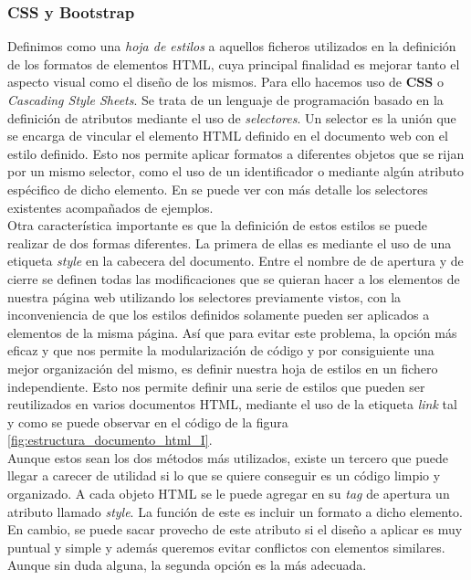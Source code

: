 \documentclass[../main.tex]{subfiles}
\begin{document}
    \subsubsection{CSS y Bootstrap}
    Definimos como una \textit{hoja de estilos} a aquellos ficheros utilizados en la definición de los formatos de elementos HTML, cuya principal finalidad es mejorar tanto el aspecto visual como el diseño de los mismos. Para ello hacemos uso de \textbf{CSS} o \textit{Cascading Style Sheets}. Se trata de un lenguaje de programación basado en la definición de atributos mediante el uso de \textit{selectores}. Un selector es la unión que se encarga de vincular el elemento HTML definido en el documento web con el estilo definido. Esto nos permite aplicar formatos a diferentes objetos que se rijan por un mismo selector, como el uso de un identificador o mediante algún atributo espécifico de dicho elemento.  En \cite{selectoresCSS} se puede ver con más detalle los selectores existentes acompañados de ejemplos. \\

 
    Otra característica importante es que la definición de estos estilos se puede realizar de dos formas diferentes. La primera de ellas es mediante el uso de una etiqueta \textit{style} en la cabecera del documento. Entre el nombre de  de apertura y de cierre se definen todas las modificaciones que se quieran hacer a los elementos de nuestra página web utilizando los selectores previamente vistos, con la inconveniencia de que los estilos definidos solamente pueden ser aplicados a elementos de la misma página. Así que para evitar este problema, la opción más eficaz y que nos permite la modularización de código y por consiguiente una mejor organización del mismo, es definir nuestra hoja de estilos en un fichero independiente. Esto nos permite definir una serie de estilos que pueden ser reutilizados en varios documentos HTML, mediante el uso de la etiqueta \textit{link} tal y como se puede observar en el código de la figura \ref{fig:estructura_documento_html_I}.\\

    
    Aunque estos sean los dos métodos más utilizados, existe un tercero que puede llegar a carecer de utilidad si lo que se quiere conseguir es un código limpio y organizado. A cada objeto HTML se le puede agregar en su \textit{tag} de apertura un atributo llamado \textit{style}. La función de este es incluir un formato a dicho elemento. En cambio, se puede sacar provecho de este atributo si el diseño a aplicar es muy puntual y simple y además queremos evitar conflictos con elementos similares. Aunque sin duda alguna, la segunda opción es la más adecuada.\hphantom{1}\\
    
\end{document}
